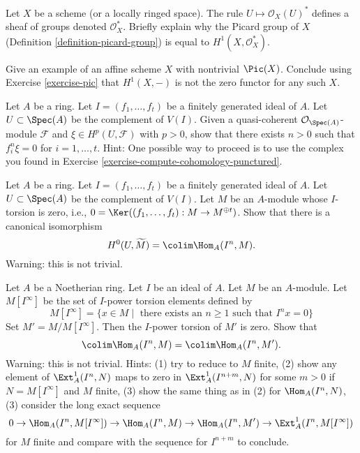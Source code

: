 \begin{exercise}
\label{exercise-pic}
Let $X$ be a scheme (or a locally ringed space). The rule
$U \mapsto \mathcal{O}_X(U)^*$ defines a sheaf of groups
denoted $\mathcal{O}_X^*$.
Briefly explain why the Picard group of $X$
(Definition \ref{definition-picard-group}) is
equal to $H^1(X, \mathcal{O}_X^*)$.
\end{exercise}

\begin{exercise}
\label{exercise-pic-nontrivial}
Give an example of an affine scheme $X$ with nontrivial $\Pic(X)$.
Conclude using Exercise \ref{exercise-pic} that $H^1(X, -)$ is not the
zero functor for any such $X$.
\end{exercise}

\begin{exercise}
\label{exercise-kill-cohomology-complement}
Let $A$ be a ring. Let $I = (f_1, \ldots, f_t)$ be a finitely generated ideal
of $A$. Let $U \subset \Spec(A)$ be the complement of $V(I)$.
Given a quasi-coherent $\mathcal{O}_{\Spec(A)}$-module $\mathcal{F}$
and $\xi \in H^p(U, \mathcal{F})$ with $p > 0$, show that there exists
$n > 0$ such that $f_i^n \xi = 0$ for $i = 1, \ldots, t$.
Hint: One possible way to proceed is to use the complex
you found in Exercise \ref{exercise-compute-cohomology-punctured}.
\end{exercise}

\begin{exercise}
\label{exercise-h0-complement}
Let $A$ be a ring. Let $I = (f_1, \ldots, f_t)$ be a
finitely generated ideal of $A$. Let $U \subset \Spec(A)$
be the complement of $V(I)$. Let $M$ be an $A$-module
whose $I$-torsion is zero, i.e.,
$0 = \Ker((f_1, \ldots, f_t) : M \to M^{\oplus t})$.
Show that there is a canonical isomorphism
$$
H^0(U, \widetilde{M}) = \colim \Hom_A(I^n, M).
$$
Warning: this is not trivial.
\end{exercise}

\begin{exercise}
\label{exercise-Noetherian}
Let $A$ be a Noetherian ring. Let $I$ be an ideal of $A$.
Let $M$ be an $A$-module. Let $M[I^\infty]$ be the set of
$I$-power torsion elements defined by
$$
M[I^\infty] = \{x \in M \mid
\text{ there exists an }n \geq 1\text{ such that }I^nx = 0\}
$$
Set $M' = M/M[I^\infty]$. Then the $I$-power torsion of $M'$ is zero.
Show that
$$
\colim \Hom_A(I^n, M) = \colim \Hom_A(I^n, M').
$$
Warning: this is not trivial. Hints: (1) try to reduce to $M$ finite,
(2) show any element of $\Ext^1_A(I^n, N)$
maps to zero in $\Ext^1_A(I^{n + m}, N)$ for some $m > 0$
if $N = M[I^\infty]$ and $M$ finite, (3) show the same thing
as in (2) for $\Hom_A(I^n, N)$, (3) consider the long exact
sequence
$$
0 \to \Hom_A(I^n, M[I^\infty]) \to \Hom_A(I^n, M) \to \Hom_A(I^n, M')
\to \Ext^1_A(I^n, M[I^\infty])
$$
for $M$ finite and compare with the sequence for $I^{n + m}$ to conclude.
\end{exercise}








